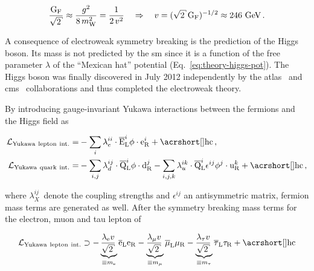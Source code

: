 \begin{equation}
\frac{\mathrm{G}_\mathrm{F}}{\sqrt{2}}\approx\frac{g^2}{8\,m_\mathrm{W}^{2}}=\frac{1}{2\,v^2}
\quad\Rightarrow\quad v=(\sqrt{2}\,\mathrm{G}_\mathrm{F})^{-1/2}\approx 246~\GeV\,.
\end{equation}
 
A consequence of electroweak symmetry breaking is the prediction of the Higgs boson. Its mass is not predicted by the \gls{sm} since it is a function of the free parameter $\lambda$ of the ``Mexican hat'' potential (Eq.~\ref{eq:theory-higgs-pot}). The Higgs boson was finally discovered in July 2012 independently by the \gls{atlas}~\cite{Aad:2012tfa} and \gls{cms}~\cite{Chatrchyan:2012xdj} collaborations and thus completed the electroweak theory. 


By introducing gauge-invariant Yukawa interactions between the fermions and the Higgs field as 

\begin{subequations}
\begin{align}
\mathcal{L}_\mathrm{Yukawa~lepton~int.}=&-\sum_{i}\lambda_{e}^{ii}\cdot\bar{\mathrm{E}}^{i}_\mathrm{L}\phi\cdot\mathrm{e}^{i}_\mathrm{R}+\mathrm{\gls{hc}}\,, \label{eq:theory-lepton-yukawa}\\
\mathcal{L}_\mathrm{Yukawa~quark~int.}=&-\sum_{i,j}\lambda_{d}^{ij}\cdot\bar{\mathrm{Q}}^{i}_\mathrm{L}\phi\cdot\mathrm{d}^{j}_\mathrm{R}-\sum_{i,j,k}\lambda_{u}^{ik}\cdot\bar{\mathrm{Q}}^{i}_\mathrm{L}\epsilon^{ij}\phi^{j}\cdot\mathrm{u}^{k}_\mathrm{R} +\mathrm{\gls{hc}}\,, \label{eq:theory-quark-yukawa}
\end{align}
\end{subequations}

where $\lambda_{X}^{ij}\,$  denote the coupling strengths and $\epsilon^{ij}$ an antisymmetric matrix, fermion mass terms are generated as well. After the symmetry breaking mass terms for the electron, muon and tau lepton of 

\begin{equation}
\mathcal{L}_\mathrm{Yukawa~lepton~int.}\supset-\underbrace{\frac{\lambda_\mathrm{e} v}{\sqrt{2}}\,}_{\equiv m_\mathrm{e}}\bar{\mathrm{e}}_\mathrm{L}\mathrm{e}_\mathrm{R}-\underbrace{\frac{\lambda_{\mu} v}{\sqrt{2}}\,}_{\equiv m_{\mu}}\bar{\mu}_\mathrm{L}{\mu}_\mathrm{R}-\underbrace{\frac{\lambda_{\tau} v}{\sqrt{2}}\,}_{\equiv m_{\tau}}\bar{\tau}_\mathrm{L}{\tau}_\mathrm{R}+\mathrm{\gls{hc}}
\end{equation}

